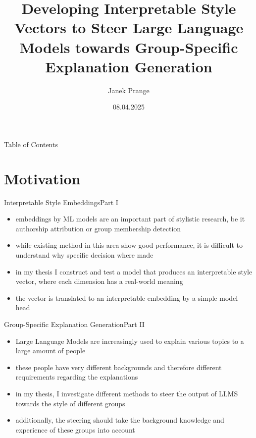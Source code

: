 \documentclass[]{beamer}
\title[Master's Thesis Presentation]{Developing Interpretable Style Vectors to Steer Large Language Models towards Group-Specific Explanation Generation}
\date{08.04.2025}
\author{Janek Prange}
\begin{document}
\begin{frame}
  \titlepage
\end{frame}

\begin{frame}[shrink,t]{Table of Contents}
  \tableofcontents
\end{frame}


\section{Motivation}
\begin{frame}{Interpretable Style Embeddings}{Part I}
  \begin{itemize}
    \item embeddings by ML models are an important part of stylistic research, be it authorship attribution or group membership detection
    \item while existing method in this area show good performance, it is difficult to understand why specific decision where made
          \pause
    \item in my thesis I construct and test a model that produces an interpretable style vector, where each dimension has a real-world meaning
    \item the vector is translated to an interpretable embedding by a simple model head
  \end{itemize}
\end{frame}

\begin{frame}{Group-Specific Explanation Generation}{Part II}
  \begin{itemize}
    \item Large Language Models are increasingly used to explain various topics to a large amount of people
    \item these people have very different backgrounds and therefore different requirements regarding the explanations
          \pause
    \item in my thesis, I investigate different methods to steer the output of LLMS towards the style of different groups
    \item additionally, the steering should take the background knowledge and experience of these groups into account
  \end{itemize}
\end{frame}
\end{document}
